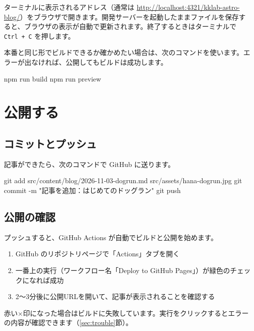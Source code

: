 \documentclass[a4paper,11pt]{ltjsarticle}
\begin{document}
ターミナルに表示されるアドレス（通常は \url{http://localhost:4321/kklab-astro-blog/}）をブラウザで開きます。開発サーバーを起動したままファイルを保存すると、ブラウザの表示が自動で更新されます。終了するときはターミナルで \texttt{Ctrl + C} を押します。

本番と同じ形でビルドできるか確かめたい場合は、次のコマンドを使います。エラーが出なければ、公開してもビルドは成功します。

\begin{code}
npm run build
npm run preview
\end{code}

\section{公開する}\label{sec:publish}

\subsection{コミットとプッシュ}

記事ができたら、次のコマンドで GitHub に送ります。

\begin{code}
git add src/content/blog/2026-11-03-dogrun.md src/assets/hana-dogrun.jpg
git commit -m "記事を追加：はじめてのドッグラン"
git push
\end{code}

\subsection{公開の確認}

プッシュすると、GitHub Actions が自動でビルドと公開を始めます。

\begin{enumerate}
  \item GitHub のリポジトリページで「Actions」タブを開く
  \item 一番上の実行（ワークフロー名「Deploy to GitHub Pages」）が緑色のチェックになれば成功
  \item 2〜3分後に公開URLを開いて、記事が表示されることを確認する
\end{enumerate}

赤い×印になった場合はビルドに失敗しています。実行をクリックするとエラーの内容が確認できます（\ref{sec:trouble}節）。

\end{document}
